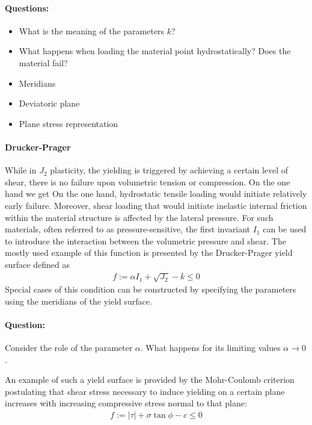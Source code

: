 \documentclass[main.tex]{subfiles}
\begin{document}
\paragraph{Questions:} 
\begin{itemize}
\item What is the meaning of the parameters $k$?
\item What happens when loading the material point hydrostatically? Does the material fail? 
\item Meridians
\item Deviatoric plane
\item Plane stress representation
\end{itemize}

\paragraph{Drucker-Prager}
While in $J_2$ plasticity, the yielding is triggered by achieving a certain level of shear, there is no failure upon volumetric tension or compression. On the one hand we get 
On the one hand, hydrostatic tensile loading would initiate relatively early failure. Moreover, shear loading that would initiate inelastic internal friction within the material structure is affected by the lateral pressure. For such materials, often referred to as pressure-sensitive, the first invariant $I_1$ can be used to introduce the interaction between the volumetric pressure and shear. The mostly used example of this function is presented by the Drucker-Prager yield surface defined as 
\begin{align}
    \label{EQ:Drucker-Prager}
    f := \alpha I_1 + \sqrt{J_2} - k \leq 0
\end{align}
Special cases of this condition can be constructed by specifying the parameters using the meridians of the yield surface.
\paragraph{Question:} Consider the role of the parameter $\alpha$. What happens for its limiting values $\alpha \rightarrow 0$.

An example of such a yield surface is provided by the Mohr-Coulomb criterion postulating that shear stress necessary to induce yielding on a certain plane increases with increasing compressive stress normal to that plane:
\begin{align}
\label{EQ:MohrCoulomb}
 f := \left| \tau \right| + \sigma \tan \phi - c \leq 0 
\end{align}
\end{document}
